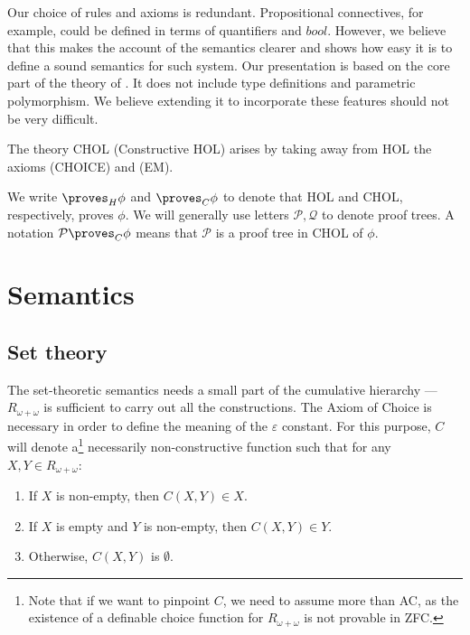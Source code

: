 \documentclass{LMCS}
\newcommand{\p}{\proves}
\newcommand{\pr}[1]{\mathcal{#1}}
\begin{document}
Our choice of rules and axioms is redundant. Propositional connectives,
for example, could be defined in terms of quantifiers and $bool$. 
However, we believe that this makes the account of the semantics clearer and
shows how easy it is to define a sound semantics for such system. Our
presentation is based on the core part of the theory of \cite{GM93}. It does
not include type definitions and parametric polymorphism. We believe extending it to
incorporate these features should not be very difficult. 

The theory CHOL (Constructive HOL) arises by taking away from HOL the axioms
(CHOICE) and (EM).

We write $\p_H \phi$ and $\p_C \phi$ to denote that HOL and CHOL,
respectively, proves $\phi$. We will generally use letters $\pr{P}, \pr{Q}$ to denote
proof trees. A notation $\pr{P} \p_C \phi$ means that $\pr{P}$ is a proof tree in CHOL
of $\phi$. 

\section{Semantics}\label{semantics}

\subsection{Set theory}

The set-theoretic semantics needs a small part of the cumulative hierarchy --- $R_{\omega + \omega}$ is
sufficient to carry out all the constructions. The Axiom of Choice is necessary
in order to define the meaning of the $\varepsilon$ constant. For this
purpose, $C$ will denote a\footnote{Note that if we want to pinpoint $C$, we need to assume more than AC, as the
existence of a definable choice function for $R_{\omega + \omega}$ is not
provable in ZFC.} necessarily non-constructive function such that for any $X, Y \in R_{\omega +
\omega}$:
\begin{enumerate}[$\bullet$]
\item If $X$ is non-empty, then $C(X, Y) \in X$.
\item If $X$ is empty and $Y$ is non-empty, then $C(X, Y) \in Y$. 
\item Otherwise, $C(X, Y)$ is $\emptyset$. 
\end{enumerate}
\end{document}
